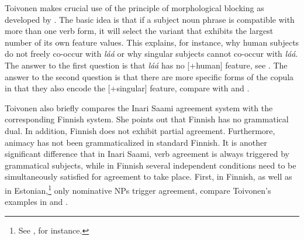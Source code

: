 \documentclass[output=paper,hidelinks]{langscibook}
\begin{document}
\ea%
    \label{ex:FinnoUgric:45}
    \z

\ea%
    \label{ex:FinnoUgric:46}
    \z

\ea%
    \label{ex:FinnoUgric:47}
    \z

Toivonen makes crucial use of the principle of morphological blocking as developed by \citet{Andrews90}. The basic idea is that if a subject noun phrase is compatible with more than one verb form, it will select the variant that exhibits the largest number of its own feature values. This explains, for instance, why human subjects do not freely co-occur with \textit{láá} or why singular subjects cannot co-occur with \textit{láá}. The answer to the first question is that \textit{láá} has no [+human] feature, see . The answer to the second question is that there are more specific forms of the copula in that they also encode the [+singular] feature, compare  with  and .

Toivonen also briefly compares the Inari Saami agreement system with the corresponding Finnish system. She points out that Finnish has no grammatical dual. In addition, Finnish does not exhibit partial agreement. Furthermore, animacy has not been grammaticalized in standard Finnish. It is another significant difference that in Inari Saami, verb agreement is always triggered by grammatical subjects, while in Finnish several independent conditions need to be simultaneously satisfied for agreement to take place. First, in Finnish, as well as in Estonian,\footnote{See \citet{Hiietam2003}, for instance.} only nominative NPs trigger agreement, compare Toivonen's examples in  and . 
\end{document}
